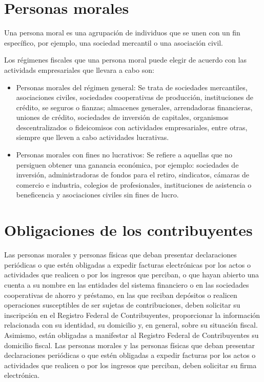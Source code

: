 \section{Personas morales}
Una persona moral es una agrupación de individuos que se unen con un fin específico, por ejemplo, una sociedad mercantil o una asociación civil.

Los régimenes fiscales  \cite{SANTANDER-PERSONAS} que una persona moral puede elegir de acuerdo con las actividads empresariales que llevara a cabo son:
\begin{itemize}
  \item Personas morales del régimen general: Se trata de sociedades mercantiles, asociaciones civiles, sociedades cooperativas de producción, instituciones de crédito, se seguros o fianzas; almacenes generales, arrendadoras financieras, uniones de crédito, sociedades de inversión de capitales, organismos descentralizados o fideicomisos con actividades empresariales, entre otras, siempre que lleven a cabo actividades lucrativas.
  \item Personas morales con fines no lucrativos: Se refiere a aquellas que no persiguen obtener una ganancia económica, por ejemplo: sociedades de inversión, administradoras de fondos para el retiro, sindicatos, cámaras de comercio e industria, colegios de profesionales, instituciones de asistencia o beneficencia y asociaciones civiles sin fines de lucro.
\end{itemize}
  \bigskip
\section{Obligaciones de los contribuyentes} 

Las personas morales y personas físicas que deban presentar declaraciones periódicas o que estén obligadas a expedir facturas electrónicas por los actos o actividades que realicen o por los ingresos que perciban, o que hayan abierto una cuenta a su nombre en las entidades del sistema financiero o en las sociedades cooperativas de ahorro y préstamo, en las que reciban depósitos o realicen operaciones susceptibles de ser sujetas de contribuciones, deben solicitar su inscripción en el Registro Federal de Contribuyentes, proporcionar la información relacionada con su identidad, su domicilio y, en general, sobre su situación fiscal. Asimismo, están obligadas a manifestar al Registro Federal de Contribuyentes su domicilio fiscal. Las personas morales y las personas físicas que deban presentar declaraciones periódicas o que estén obligadas a expedir facturas por los actos o actividades que realicen o por los ingresos que perciban, deben solicitar su firma electrónica. \cite{SAT-OBLIGACIONES}%
 \bigskip
